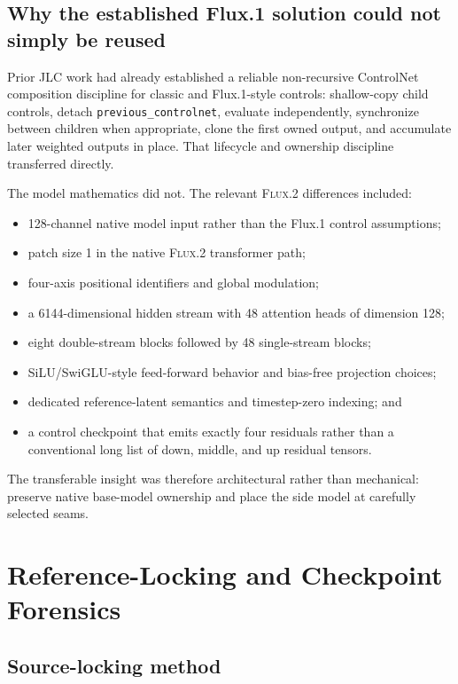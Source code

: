 \documentclass[11pt]{article}
\newcommand{\FluxTwo}{\textsc{Flux.2}}
\newcommand{\JLC}{\textsc{JLC}}
\newcommand{\code}[1]{\texttt{#1}}
\begin{document}
\subsection{Why the established Flux.1 solution could not simply be reused}

Prior \JLC{} work had already established a reliable non-recursive ControlNet composition discipline for classic and Flux.1-style controls: shallow-copy child controls, detach \code{previous\_controlnet}, evaluate independently, synchronize between children when appropriate, clone the first owned output, and accumulate later weighted outputs in place. That lifecycle and ownership discipline transferred directly.

The model mathematics did not. The relevant \FluxTwo{} differences included:

\begin{itemize}
  \item 128-channel native model input rather than the Flux.1 control assumptions;
  \item patch size 1 in the native \FluxTwo{} transformer path;
  \item four-axis positional identifiers and global modulation;
  \item a 6144-dimensional hidden stream with 48 attention heads of dimension 128;
  \item eight double-stream blocks followed by 48 single-stream blocks;
  \item SiLU/SwiGLU-style feed-forward behavior and bias-free projection choices;
  \item dedicated reference-latent semantics and timestep-zero indexing; and
  \item a control checkpoint that emits exactly four residuals rather than a conventional long list of down, middle, and up residual tensors.
\end{itemize}

The transferable insight was therefore architectural rather than mechanical: preserve native base-model ownership and place the side model at carefully selected seams.

\section{Reference-Locking and Checkpoint Forensics}

\subsection{Source-locking method}
\end{document}
